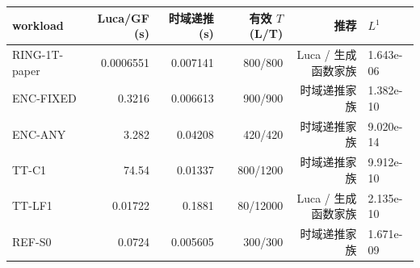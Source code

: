 \begin{tabular}{lrrrrl}
\toprule
 workload & Luca/GF (s) & 时域递推 (s) & 有效 $T$ (L/T) & 推荐 & $L^1$ \\
\midrule
RING-1T-paper & 0.0006551 & 0.007141 & 800/800 & Luca / 生成函数家族 & 1.643e-06 \\
ENC-FIXED & 0.3216 & 0.006613 & 900/900 & 时域递推家族 & 1.382e-10 \\
ENC-ANY & 3.282 & 0.04208 & 420/420 & 时域递推家族 & 9.020e-14 \\
TT-C1 & 74.54 & 0.01337 & 800/1200 & 时域递推家族 & 9.912e-10 \\
TT-LF1 & 0.01722 & 0.1881 & 80/12000 & Luca / 生成函数家族 & 2.135e-10 \\
REF-S0 & 0.0724 & 0.005605 & 300/300 & 时域递推家族 & 1.671e-09 \\
\bottomrule
\end{tabular}
